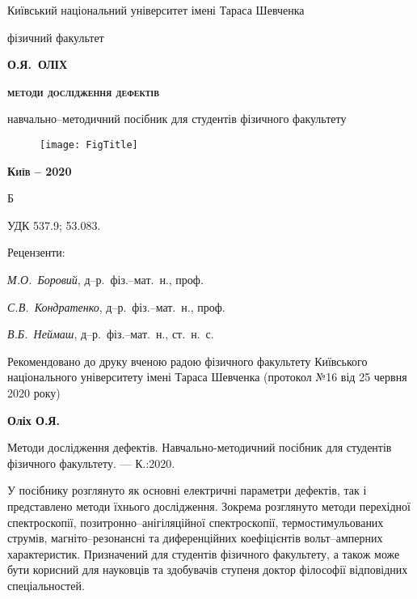 \begin{titlepage}
\begin{center}

{\small Київський національний університет  імені Тараса Шевченка}

{\small фізичний факультет}


\vspace*{2cm}
{\scshape\bfseries\Large О.Я.~ОЛІХ}

\vspace*{1cm}
{\scshape\bfseries\huge методи дослідження дефектів}

\vspace*{0.5cm}
навчально--методичний посібник для студентів фізичного факультету

\end{center}
%
\vspace*{2cm}
\begin{figure}[h]\center
\texttt{[image: FigTitle]}
\end{figure}
%
%
\begin{center}

{\scshape\bfseries Київ -- 2020}
\end{center}
\end{titlepage}
Б

УДК 537.9; 53.083.

\begin{center}

 \vspace{0.04\textheight}
 Рецензенти:
\end{center}

\emph{М.О.~Боровий}, д--р.~фіз.--мат.~н., проф.

\emph{С.В.~Кондратенко}, д--р.~фіз.--мат.~н., проф.

\emph{В.Б.~Неймаш}, д--р.~фіз.--мат.~н., ст.~н.~с.


\vspace{1cm}
Рекомендовано до друку вченою радою фізичного факультету
Київського національного університету імені Тараса Шевченка
(протокол №16 від 25 червня 2020 року)



\vspace{1cm}
\textbf{Оліх О.Я.}

Методи дослідження дефектів. Навчально-методичний посібник для студентів фізичного факультету. --- К.:2020.

\vspace{1cm}
У посібнику розглянуто як основні електричні параметри дефектів,
так і представлено методи їхнього дослідження.
Зокрема розглянуто методи перехідної спектроскопії,
позитронно--анігіляційної спектроскопії,
термостимульованих струмів,
магніто--резонансні
та диференційних коефіцієнтів вольт--амперних характеристик.
Призначений для студентів фізичного факультету, а також
може бути корисний для науковців  та  здобувачів  ступеня  доктор  філософії
відповідних спеціальностей.
